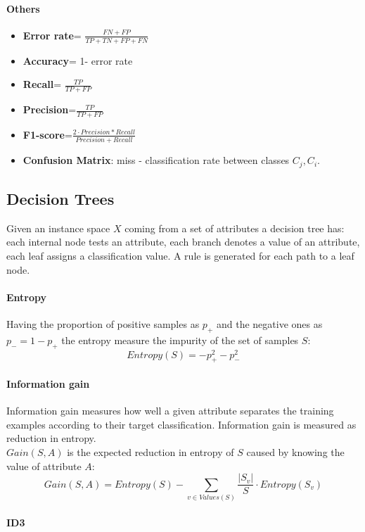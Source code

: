 \paragraph{Others}
\begin{itemize}
\item \textbf{Error rate}= $\frac{FN+FP}{TP+TN+FP+FN}$
\item \textbf{Accuracy}= 1- error rate
\item \textbf{Recall}= $\frac{TP}{TP+FP}$
\item \textbf{Precision}=$\frac{TP}{TP+FP}$
\item \textbf{F1-score}=$\frac{2 \cdot Precision * Recall}{Precision + Recall}$
\item \textbf{Confusion Matrix}: miss - classification rate between classes $C_j,C_i$.
\end{itemize}

\subsection{Decision Trees}
Given an instance space $X$ coming from a set of attributes a decision tree has: each internal node tests an attribute, each branch denotes a value of an attribute, each leaf assigns a classification value. A rule is generated for each path to a leaf node. 


\paragraph{Entropy}
Having the proportion of positive samples as $p_+$ and the negative ones as $p_-=1-p_+$ the entropy measure the impurity of the set of samples $S$:
\[Entropy(S)=-p_+^2-p_-^2\]




\paragraph{Information gain}
Information gain measures how well a given attribute separates the training examples according to their target classification. Information gain is measured as reduction in entropy.\\
$Gain(S,A)$ is the expected reduction in entropy of $S$ caused by knowing the value of attribute $A$:
\[Gain(S,A)=Entropy(S)-\sum_{v \in Values(S)}\frac{|S_v|}{S}\cdot Entropy(S_v)\] 


\paragraph{ID3}

